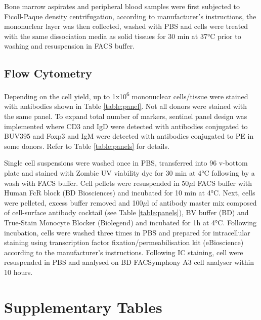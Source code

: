 Bone marrow aspirates and peripheral blood samples were first subjected to Ficoll-Paque density centrifugation, according to manufacturer's instructions, the mononuclear layer was then collected, washed with PBS and cells were treated with the same dissociation media as solid tissues for 30 min at 37°C prior to washing and resuspension in FACS buffer.

\subsection{Flow Cytometry}

Depending on the cell yield, up to 1x10\textsuperscript{6} mononuclear cells/tissue were stained with antibodies shown in Table \ref{table:panel}. Not all donors were stained with the same panel. To expand total number of markers, sentinel panel design was implemented where CD3 and IgD were detected with antibodies conjugated to BUV395 and Foxp3 and IgM were detected with antibodies conjugated to PE in some donors. Refer to Table \ref{table:panels} for details. 

Single cell suspensions were washed once in PBS, transferred into 96 v-bottom plate and stained with Zombie UV viability dye for 30 min at 4°C following by a wash with FACS buffer. Cell pellets were resuspended in 50$\mu$l FACS buffer with Human FcR block (BD Biosciences) and incubated for 10 min at 4°C. Next, cells were pelleted, excess buffer removed and 100$\mu$l of antibody master mix composed of cell-surface antibody cocktail (see Table \ref{table:panels}), BV buffer (BD) and True-Stain Monocyte Blocker (Biolegend) and incubated for 1h at 4°C. Following incubation, cells were washed three times in PBS and prepared for intracellular staining using transcription factor fixation/permeabilisation kit (eBioscience) according to the manufacturer's instructions. Following IC staining, cell were resuspended in PBS and analysed on BD FACSymphony A3 cell analyser within 10 hours.

\section{Supplementary Tables}

